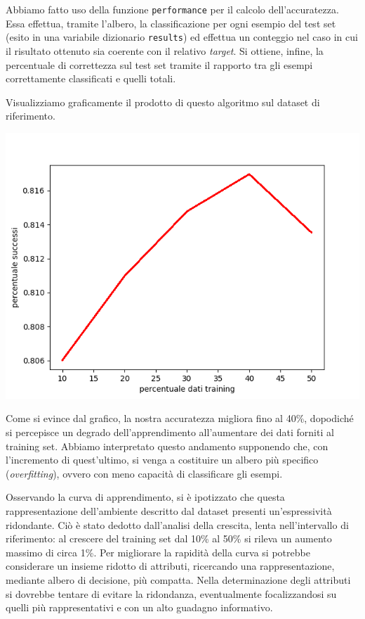 			\bigskip
		
			Abbiamo fatto uso della funzione \texttt{performance} per il calcolo dell'accuratezza. Essa effettua, tramite l'albero, la classificazione per ogni esempio del test set (esito in una variabile dizionario \texttt{results}) ed effettua un conteggio nel caso in cui il risultato ottenuto sia coerente con il relativo \emph{target}. Si ottiene, infine, la percentuale di correttezza sul test set tramite il rapporto tra gli esempi correttamente classificati e quelli totali.\par
			Visualizziamo graficamente il prodotto di questo algoritmo sul dataset di riferimento.
			
			\includegraphics[scale=0.86]{performance.png}
			 
			Come si evince dal grafico, la nostra accuratezza migliora fino al 40\%, dopodiché si percepisce un degrado dell'apprendimento all'aumentare dei dati forniti al training set. Abbiamo interpretato questo andamento supponendo che, con l'incremento di quest'ultimo, si venga a costituire un albero più specifico (\emph{overfitting}), ovvero con meno capacità di classificare gli esempi.\par
			Osservando la curva di apprendimento, si è ipotizzato che questa rappresentazione dell'ambiente descritto dal dataset presenti un'espressività ridondante. Ciò è stato dedotto dall'analisi della crescita, lenta nell'intervallo di riferimento: al crescere del training set dal 10\% al 50\% si rileva un aumento massimo di circa 1\%. Per migliorare la rapidità della curva si potrebbe considerare un insieme ridotto di attributi, ricercando una rappresentazione, mediante albero di decisione, più compatta. Nella determinazione degli attributi si  dovrebbe tentare di evitare la ridondanza, eventualmente focalizzandosi su quelli più rappresentativi e con un alto guadagno informativo.
			
